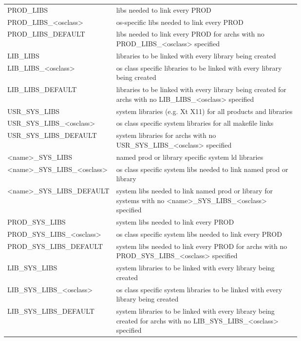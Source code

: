 \begin{center}
\begin{longtable}{lp{0.7\linewidth}}
PROD\_LIBS & libs needed to link every PROD\\
PROD\_LIBS\_\textless{}osclass\textgreater{} & os-specific libs needed to link every PROD\\
PROD\_LIBS\_DEFAULT & libs needed to link every PROD for archs with no PROD\_LIBS\_\textless{}osclass\textgreater{} specified\\
LIB\_LIBS & libraries to be linked with every library being created\\
LIB\_LIBS\_\textless{}osclass\textgreater{} & os class specific libraries to be linked with every library being created\\
LIB\_LIBS\_DEFAULT & libraries to be linked with every library being created for archs with no LIB\_LIBS\_\textless{}osclass\textgreater{} specified\\
USR\_SYS\_LIBS & system libraries (e.g. Xt X11) for all products and libraries\\
USR\_SYS\_LIBS\_\textless{}osclass\textgreater{} & os class specific system libraries for all makefile links\\
USR\_SYS\_LIBS\_DEFAULT & system libraries for archs with no USR\_SYS\_LIBS\_\textless{}osclass\textgreater{} specified\\
\textless{}name\textgreater{}\_SYS\_LIBS & named prod or library specific system ld libraries\\
\textless{}name\textgreater{}\_SYS\_LIBS\_\textless{}osclass\textgreater{} & os class specific system libs needed to link named prod or library\\
\textless{}name\textgreater{}\_SYS\_LIBS\_DEFAULT & system libs needed to link named prod or library for systems with no \textless{}name\textgreater{}\_SYS\_LIBS\_\textless{}osclass\textgreater{} specified\\
PROD\_SYS\_LIBS & system libs needed to link every PROD\\
PROD\_SYS\_LIBS\_\textless{}osclass\textgreater{} & os class specific system libs needed to link every PROD\\
PROD\_SYS\_LIBS\_DEFAULT & system libs needed to link every PROD for archs with no PROD\_SYS\_LIBS\_\textless{}osclass\textgreater{} specified\\
LIB\_SYS\_LIBS & system libraries to be linked with every library being created\\
LIB\_SYS\_LIBS\_\textless{}osclass\textgreater{} & os class specific system libraries to be linked with every library being created\\
LIB\_SYS\_LIBS\_DEFAULT & system libraries to be linked with every library being created for archs with no LIB\_SYS\_LIBS\_\textless{}osclass\textgreater{} specified\\

\end{longtable}
\end{center}
